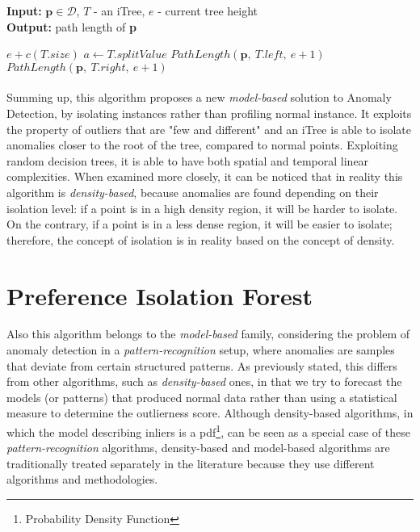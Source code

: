 \begin{algorithm}[h!]
    \caption{$PathLength(\textbf{p},\ T,\ e)$}
    \label{alg:path_function}
    \textbf{Input:} $\textbf{p} \in \mathcal{D}$, $T$ - an iTree, $e$ - current tree height \\
    \textbf{Output:} path length of \textbf{p}
    \begin{algorithmic}[1]
        \State \Return $e + c(T.size)$ 
    \EndIf
    \State $a \gets T.splitValue$
        \State \Return $PathLength(\textbf{p},\ T.left,\ e+1)$
    \Else   {}
        \State \Return $PathLength(\textbf{p},\ T.right,\ e+1)$
    \EndIf
    \end{algorithmic}
\end{algorithm}

\paragraph{}
Summing up, this algorithm proposes a new \textit{model-based} solution to Anomaly Detection, by isolating instances rather than profiling normal instance. It exploits the property of outliers that are "few and different" and an iTree is able to isolate anomalies closer to the root of the tree, compared to normal points. Exploiting random decision trees, it is able to have both spatial and temporal linear complexities. \newline
When examined more closely, it can be noticed that in reality this algorithm is \textit{density-based}, because anomalies are found depending on their isolation level: if a point is in a high density region, it will be harder to isolate. On the contrary, if a point is in a less dense region, it will be easier to isolate; therefore, the concept of isolation is in reality based on the concept of density.

\section{Preference Isolation Forest}
\label{sec:pif}

Also this algorithm belongs to the \textit{model-based} family, considering the problem of anomaly detection in a \textit{pattern-recognition} setup, where anomalies are samples that deviate from certain structured patterns. As previously stated, this differs from other algorithms, such as \textit{density-based} ones, in that we try to forecast the models (or patterns) that produced normal data rather than using a statistical measure to determine the outlierness score. Although density-based algorithms, in which the model describing inliers is a pdf\footnote{Probability Density Function}, can be seen as a special case of these \textit{pattern-recognition} algorithms, density-based and model-based algorithms are traditionally treated separately in the literature because they use different algorithms and methodologies. 

